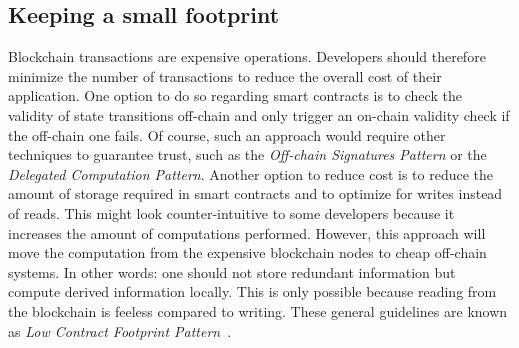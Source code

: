 \subsection{Keeping a small footprint}
\label{sec:background:on_vs_off_chain:pattern_small_footprint}
Blockchain transactions are expensive operations. Developers should therefore minimize the number of transactions to reduce the overall cost of their application. One option to do so regarding smart contracts is to check the validity of state transitions off-chain and only trigger an on-chain validity check if the off-chain one fails. Of course, such an approach would require other techniques to guarantee trust, such as the \textit{Off-chain Signatures Pattern} or the \textit{Delegated Computation Pattern}. Another option to reduce cost is to reduce the amount of storage required in smart contracts and to optimize for writes instead of reads. This might look counter-intuitive to some developers because it increases the amount of computations performed. However, this approach will move the computation from the expensive blockchain nodes to cheap off-chain systems. In other words: one should not store redundant information but compute derived information locally. This is only possible because reading from the blockchain is feeless compared to writing. These general guidelines are known as \textit{Low Contract Footprint Pattern}~\cite{eberhardt17off_block}.


